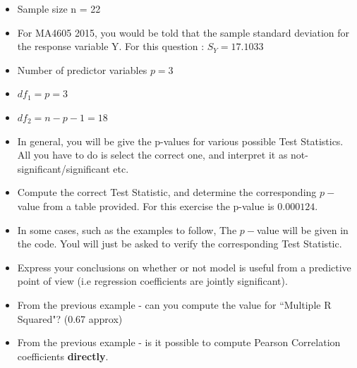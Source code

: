 \documentclass[a4paper,12pt]{article}
\begin{document}
\begin{itemize}
\item Sample size n = 22
\item For MA4605 2015, you would be told that the sample standard deviation for the response variable Y. For this question : $S_Y = 17.1033$
\item Number of predictor variables $p  = 3$
\item $df_1 = p = 3$
\item $df_2 = n-p-1 = 18$
\item In general, you will be give the p-values for various possible Test Statistics. All you have to do is select the correct one, and interpret it as not-significant/significant etc. 
\item Compute the correct Test Statistic, and determine the corresponding $p-$value from a table provided. For this exercise the p-value is $0.000124$. 
\item In some cases, such as the examples to follow, The $p-$value will be given in the code. Youl will just be asked to verify the corresponding Test Statistic.

\item Express your conclusions on whether or not model is useful from a predictive point of view (i.e regression coefficients are jointly significant).
\item From the previous example - can you compute the value for ``Multiple R Squared"? (0.67 approx)
\item From the previous example - is it possible to compute Pearson Correlation coefficients \textbf{directly}.
\end{itemize}
\newpage
\end{document}
